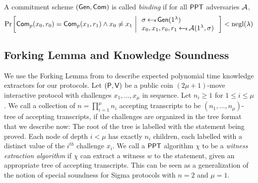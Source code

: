 \begin{definition}\label{defn:bindingcomm}
A commitment scheme $(\mathsf{Gen},\mathsf{Com})$ is called {\em binding} if for all $\mathsf{PPT}$ adversaries $\mathcal{A}$, 
\begin{align*}
\condprob{\com_p(x_0,r_0)=\com_p(x_1,r_1)\wedge x_0\neq x_1}{
\begin{array}{l}
\sigma\sample \gen(\secparam) \\
x_0,x_1,r_0,r_1 \sample \adv(\secparam,\sigma)
\end{array}
} < \negl(\lambda)
\end{align*}

\end{definition}

\subsection{Forking Lemma and Knowledge Soundness}
We use the Forking Lemma from \cite{InnerProductDLS,bulletproofs} to describe 
expected polynomial time knowledge extractors for our protocols. Let
$(\mathsf{P},\mathsf{V})$ be a public coin $(2\mu+1)$-move interactive protocol with
challenges $x_1,\ldots,x_\mu$ in sequence. Let $n_i\geq 1$ for $1\leq i\leq
\mu$. We call a collection of $n=\prod_{i=1}^\mu n_i$ accepting transcripts to be
$(n_1,\ldots,n_\mu)$-tree of accepting transcripts, if the challenges are
organized in the tree format that we describe now:  The root of the tree is
labelled with the statement being proved. Each node of depth $i<\mu$ has exactly
$n_i$ children, each labelled with a distinct value of the $i^{th}$ challenge
$x_i$. We call a $\mathsf{PPT}$ algorithm $\chi$ to be a {\em witness extraction
algorithm} if $\chi$ can extract a witness $w$ to the statement, given an
appropriate tree of accepting transcripts. This can be seen as a generalization
of the notion of special soundness for Sigma protocols with $n=2$ and $\mu=1$.

